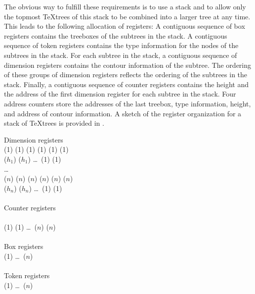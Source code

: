 The obvious way to fulfill these requirements is to use a stack and to
allow only the topmost \TeX{}trees of this stack to be
combined into a larger tree at any time.
This leads to the following allocation of registers: A contiguous sequence of
box registers contains the treeboxes of the subtrees in the stack. A
contiguous sequence of token registers contains the type information for the
nodes of the subtrees in the stack. For each subtree in the stack,
a contiguous sequence of dimension registers contains the contour
information of the subtree. The ordering of these groups of dimension
registers reflects the ordering of the subtrees in the
stack. Finally, a contiguous sequence of counter registers contains
the height and the address of the first dimension register for
each subtree in the stack. Four address counters store the addresses
of the last treebox, type information, height, and address of contour
information. A sketch of the register organization for a stack of \TeX{}trees
is provided in .

\begin{Figure}
Dimension registers\\
(1) (1) (1) (1) (1)
               (1)\\
($h_1$) ($h_1$) \dots\ (1) (1)\\
\dots\\
($n$) ($n$) ($n$) ($n$)
                 ($n$) ($n$)\\
($h_n$) ($h_n$) \dots\ (1) (1)\\
\mbox{}\\
Counter registers\\
   \\
(1) (1) \dots\ ($n$)
                    ($n$)\\
\mbox{}\\
Box registers\\
(1) \dots\ ($n$)\\
\mbox{}\\
Token registers\\
(1) \dots\ ($n$)

\caption{, , ,
 contain pointers to ($n$)
($n$), ($n$), ($n$),
($i$) contains a pointer to
($i$). Unused dimension registers are
allowed between the dimension registers of subsequent trees. The counter
registers ,\ldots,($n$) serve as a directory
mechanism to access the \TeX{}trees on the stack.}
\label{Registers}
\end{Figure}


